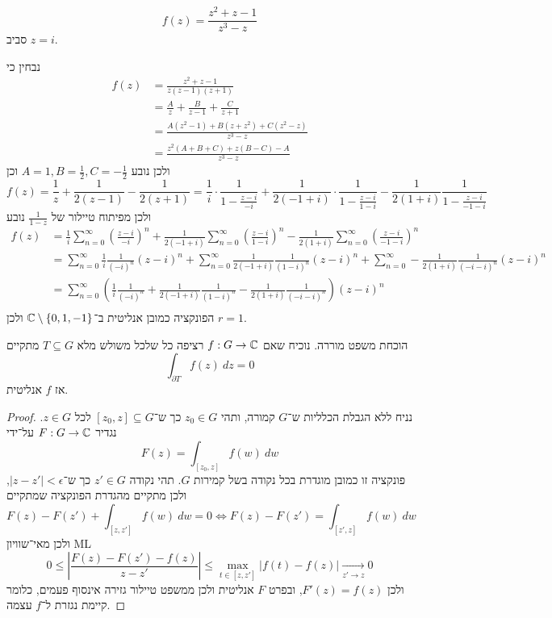 \subquestion{}
\[
	f(z) = \frac{z^2 + z - 1}{z^3 - z}
\]
סביב $z = i$.
\begin{solution}
	נבחין כי
	\begin{align*}
		f(z)
		& = \frac{z^2 + z - 1}{z(z - 1)(z + 1)} \\
		& = \frac{A}{z} + \frac{B}{z - 1} + \frac{C}{z + 1} \\
		& = \frac{A(z^2 - 1) + B(z + z^2) + C(z^2 - z)}{z^3 - z} \\
		& = \frac{z^2 (A + B + C) + z(B - C) - A}{z^3 - z}
	\end{align*}
	ולכן נובע $A = 1, B = \frac{1}{2}, C = -\frac{1}{2}$ וכן
	\[
		f(z)
		= \frac{1}{z} + \frac{1}{2(z - 1)} - \frac{1}{2(z + 1)}
		= \frac{1}{i} \cdot \frac{1}{1 - \frac{z - i}{-i}} + \frac{1}{2(-1 + i)} \cdot \frac{1}{1 - \frac{z - i}{1 - i}} - \frac{1}{2(1 + i)} \frac{1}{1 - \frac{z - i}{-1 - i}}
	\]
	ולכן מפיתוח טיילור של $\frac{1}{1 - z}$ נובע
	\begin{align*}
		f(z)
		& = \frac{1}{i} \sum_{n = 0}^{\infty} {\left(\frac{z - i}{-i}\right)}^n + \frac{1}{2(-1 + i)} \sum_{n = 0}^{\infty} {\left(\frac{z - i}{1 - i}\right)}^n
		- \frac{1}{2(1 + i)} \sum_{n = 0}^{\infty} {\left(\frac{z - i}{-1 - i}\right)}^n \\
		& = \sum_{n = 0}^{\infty} \frac{1}{i} \frac{1}{{(-i)}^n} {(z - i)}^n + \sum_{n = 0}^{\infty} \frac{1}{2(-1 + i)} \frac{1}{{(1 - i)}^n} {(z - i)}^n
		+ \sum_{n = 0}^{\infty} - \frac{1}{2(1 + i)} \frac{1}{{(-i - i)}^n} {(z - i)}^n \\
		& = \sum_{n = 0}^{\infty} \left(\frac{1}{i} \frac{1}{{(-i)}^n} + \frac{1}{2(-1 + i)} \frac{1}{{(1 - i)}^n} - \frac{1}{2(1 + i)} \frac{1}{{(-i - i)}^n}\right) {(z - i)}^n \\
	\end{align*}
	הפונקציה כמובן אנליטית ב־$\mathbb{C} \setminus \{0, 1, -1\}$ ולכן $r = 1$.
\end{solution}

\question{}
הוכחת משפט מוררה.
נוכיח שאם $f : G \to \mathbb{C}$ רציפה כל שלכל משולש מלא $T \subseteq G$ מתקיים
\[
	\int_{\partial T} f(z)\ dz = 0
\]
אז $f$ אנליטית.
\begin{proof}
	נניח ללא הגבלת הכלליות ש־$G$ קמורה, ותהי $z_0 \in G$ כך ש־$[z_0, z] \subseteq G$ לכל $z \in G$.
	נגדיר $F : G \to \mathbb{C}$ על־ידי
	\[
		F(z) = \int_{[z_0, z]} f(w)\ dw
	\]
	פונקציה זו כמובן מוגדרת בכל נקודה בשל קמירות $G$.
	תהי נקודה $z' \in G$ כך ש־$|z - z'| < \epsilon$, ולכן מתקיים מהגדרת הפונקציה שמתקיים
	\[
		F(z) - F(z') + \int_{[z, z']} f(w)\ dw = 0
		\iff
		F(z) - F(z') = \int_{[z', z]} f(w)\ dw
	\]
	ולכן מאי־שוויון ML
	\[
		0
		\le \left\lvert \frac{F(z) - F(z') - f(z)}{z - z'} \right\rvert
		\le \max_{t \in [z, z']} |f(t) - f(z)|
		\xrightarrow[z' \to z]{} 0
	\]
	ולכן $F'(z) = f(z)$, ובפרט $F$ אנליטית ולכן ממשפט טיילור גזירה אינסוף פעמים, כלומר קיימת נגזרת ל־$f$ עצמה.
\end{proof}

